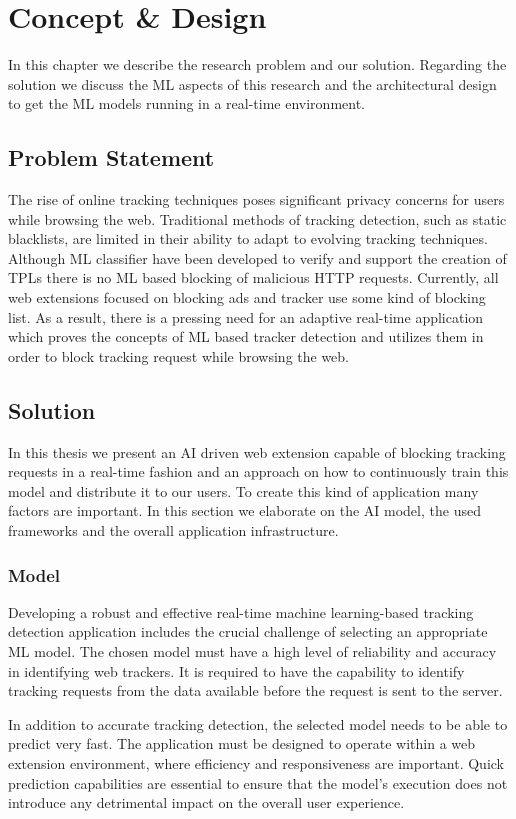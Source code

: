 \chapter{Concept \& Design}
In this chapter we describe the research problem and our solution. Regarding the solution we discuss 
the ML aspects of this research and the architectural design to get the ML models running in a real-time
environment.

\section{Problem Statement}
The rise of online tracking techniques poses significant privacy concerns for users while browsing the web.
Traditional methods of tracking detection, such as static blacklists, are limited in their ability to adapt
to evolving tracking techniques. Although ML classifier have been developed to verify and support
the creation of TPLs there is no ML based blocking of malicious HTTP requests. Currently, all web extensions focused on blocking
ads and tracker use some kind of blocking list. As a result, there is a pressing need for an adaptive real-time application which
proves the concepts of ML based tracker detection and utilizes them in order to block tracking request while browsing the web.
\section{Solution}
In this thesis we present an AI driven web extension capable of blocking tracking requests in a real-time fashion and an approach on how
to continuously train this model and distribute it to our users. To create this kind of application many factors are important. In this 
section we elaborate on the AI model, the used frameworks and the overall application infrastructure.
\subsection{Model}
Developing a robust and effective real-time machine learning-based tracking detection application includes the crucial challenge
of selecting an appropriate ML model. The chosen model must have a high level of reliability and accuracy in identifying web
trackers. It is required to have the capability to identify tracking requests from the data available before the request is sent
to the server.

In addition to accurate tracking detection, the selected model needs to be able to predict very fast.
The application must be designed to operate within a web extension environment, where efficiency and responsiveness are important.
Quick prediction capabilities are essential to ensure that the model's execution does not introduce any detrimental impact on
the overall user experience.

